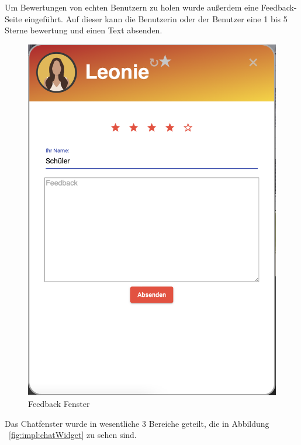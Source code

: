 Um Bewertungen von echten Benutzern zu holen wurde außerdem eine Feedback-Seite eingeführt.
Auf dieser kann die Benutzerin oder der Benutzer eine 1 bis 5 Sterne bewertung und einen Text absenden.

\begin{figure}[hbt!]
    \centering
    \includegraphics[scale=0.3]{pics/feedback}
    \caption{Feedback Fenster}
    \label{fig:impl:feedback}
\end{figure}

Das Chatfenster wurde in wesentliche 3 Bereiche geteilt, die in Abbildung ~\ref{fig:impl:chatWidget} zu sehen sind.

